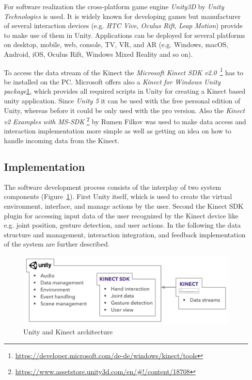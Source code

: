 For software realization the cross-platform game engine \textit{Unity3D} by \textit{Unity Technologies} is used. It is widely known for developing games but manufacturer of several interaction devices (e.g. \textit{HTC Vive}, \textit{Oculus Rift}, \textit{Leap Motion}) provide  to make use of them in Unity. Applications can be deployed for several platforms on desktop, mobile, web, console, TV, VR, and AR (e.g. Windows, macOS, Android, iOS, Oculus Rift, Windows Mixed Reality and so on).

To access the data stream of the Kinect the \textit{Microsoft Kinect SDK v2.0}~\footnote{\label{fn:kinectTools}\url{https://developer.microsoft.com/de-de/windows/kinect/tools}} has to be installed on the PC. Microsoft offers also a \textit{Kinect for Windows Unity package}\cref{fn:kinectTools}, which provides all required scripts in Unity for creating a Kinect based unity application. Since \textit{Unity 5} it can be used with the free personal edition of Unity, whereas before it could be only used with the pro version. Also the \textit{Kinect v2 Examples with MS-SDK} \footnote{\url{https://www.assetstore.unity3d.com/en/\#!/content/18708}} by Rumen Filkov was used to make data access and interaction implementation more simple as well as getting an idea on how to handle incoming data from the Kinect.


\subsection{Implementation}
The software development process consists of the interplay of two system components (Figure~\ref{fig:5_3_unityKinectArchitecture}). First Unity itself, which is used to create the virtual environment, interface, and manage actions by the user. Second the Kinect SDK plugin for accessing input data of the user recognized by the Kinect device like e.g. joint position, gesture detection, and user actions. In the following the data structure and management, interaction integration, and feedback implementation of the system are further described.
\begin{figure}[htb]
	\centering
	\begin{minipage}[t]{1\linewidth}
		\centering
		\includegraphics[width=1\linewidth]{Pictures/5_3_unityKinectArchitecture}
		\caption{Unity and Kinect architecture}
		\label{fig:5_3_unityKinectArchitecture}
	\end{minipage}
\end{figure}

